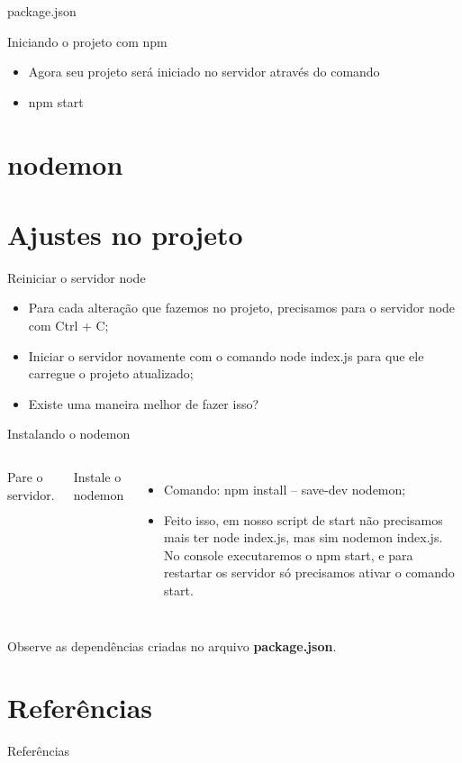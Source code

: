 \documentclass{beamer}
\begin{document}
\begin{frame}{package.json}
		\begin{exampleblock}{Iniciando o projeto com npm}
	\begin{itemize}
	\item Agora seu projeto será iniciado no servidor através do comando
	\item \alert{npm start}
	\end{itemize}
	\end{exampleblock}
    \end{frame}
 \section{nodemon}
\section{Ajustes no projeto}
    \begin{frame}{Reiniciar o servidor node}
	\begin{itemize}
	\item Para cada alteração que fazemos no projeto, precisamos para o servidor node com \alert{Ctrl + C};
	\item Iniciar o servidor novamente com o comando \alert{node index.js} para que ele carregue o projeto atualizado;
	\item Existe uma maneira melhor de fazer isso?
	\end{itemize}
    \end{frame}
    \begin{frame}{Instalando o nodemon}
      \begin{columns}[onlytextwidth]
         Pare o servidor.
        
          \vspace{0.5cm}
	Instale o nodemon
            \pause
            \begin{itemize}
		\item Comando: \alert{npm install -- save-dev nodemon};
		\item Feito isso, em nosso script de start não precisamos mais ter node index.js, mas sim nodemon index.js. No console executaremos o npm start, e para restartar os servidor só precisamos ativar o comando start.
	\end{itemize}
      \end{columns}
      Observe as dependências criadas no arquivo \textbf{package.json}.
    \end{frame}
   
\section{Referências}
    \begin{frame}{Referências}%
\small
\begin{center}
\tiny


\end{center}
\end{frame}
  
\end{document}
